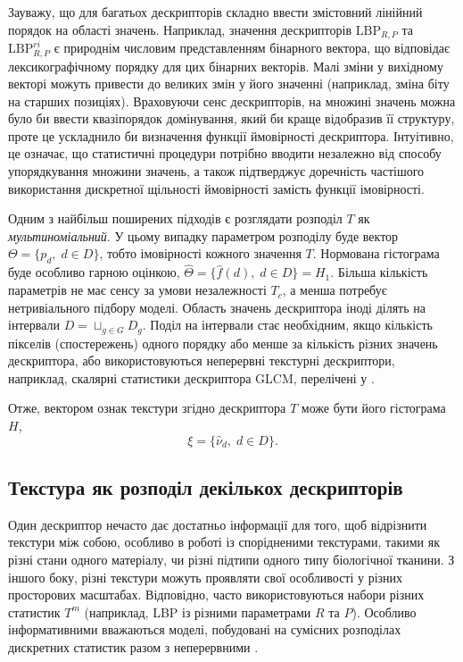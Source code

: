 Зауважу, що для багатьох дескрипторів складно ввести змістовний лінійний порядок на області значень. 
Наприклад, значення дескрипторів $\mathrm{LBP}_{R,P}$ та $\mathrm{LBP}^{ri}_{R,P}$ є природнім числовим представленням бінарного вектора, що відповідає лексикографічному порядку для цих бінарних векторів.
Малі зміни у вихідному векторі можуть привести до великих змін у його значенні (наприклад, зміна біту на старших позиціях).
Враховуючи сенс дескрипторів, на множині значень можна було би ввести квазіпорядок домінування, який би краще відобразив її структуру, проте це ускладнило би визначення функції ймовірності дескриптора.
Інтуітивно, це означає, що статистичні процедури потрібно вводити незалежно від способу упорядкування множини значень, 
а також підтверджує доречність частішого використання дискретної щільності ймовірності замість функції імовірності.

Одним з найбільш поширених підходів є розглядати розподіл $T$ як \textit{мультиноміальний}. 
У цьому випадку параметром розподілу буде вектор $\Theta = \{p_d, \; d\in D\}$, тобто імовірності кожного значення $T$.
Нормована гістограма буде особливо гарною оцінкою, $\hat \Theta = \{\hat f(d), \; d\in D\} = H_1$.
Більша кількість параметрів не має сенсу за умови незалежності $T_c$, а менша потребує нетривіального підбору моделі.
Область значень дескриптора іноді ділять на інтервали $D = \sqcup_{g\in G} D_g$.
Поділ на інтервали стає необхідним, якщо кількість пікселів (спостережень) одного порядку або менше за кількість різних значень дескриптора, 
або використовуються неперервні текстурні дескриптори, наприклад, скалярні статистики дескриптора GLCM, перелічені у \cite{belsare2015}.

Отже, вектором ознак текстури згідно дескриптора $T$ може бути його гістограма $H$,
\begin{equation*}
    \xi = \{\hat\nu_d, \; d\in D\}.
\end{equation*}

\subsection{Текстура як розподіл декількох дескрипторів}\label{section1.2b}\hfill

Один дескриптор нечасто дає достатньо інформації для того, щоб відрізнити текстури між собою, особливо в роботі із спорідненими текстурами, 
такими як різні стани одного матеріалу, чи різні підтипи одного типу біологічної тканини.
З іншого боку, різні текстури можуть проявляти свої особливості у різних просторових масштабах.
Відповідно, часто використовуються набори різних статистик $T^m$ (наприклад, LBP із різними параметрами $R$ та $P$).
Особливо інформативними вважаються моделі, побудовані на сумісних розподілах дискретних статистик разом з неперервними \cite{guo2010lbpv}.

